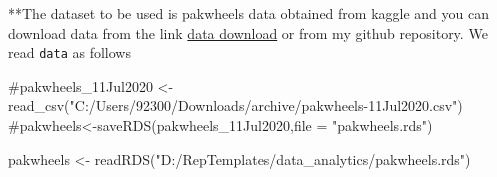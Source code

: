 \documentclass[
  letterpaper,
  DIV=11,
  numbers=noendperiod]{scrartcl}
\newenvironment{Shaded}{\begin{snugshade}}{\end{snugshade}}
\newcommand{\CommentTok}[1]{\textcolor[rgb]{0.37,0.37,0.37}{#1}}
\newcommand{\FunctionTok}[1]{\textcolor[rgb]{0.28,0.35,0.67}{#1}}
\newcommand{\NormalTok}[1]{\textcolor[rgb]{0.00,0.23,0.31}{#1}}
\newcommand{\OtherTok}[1]{\textcolor[rgb]{0.00,0.23,0.31}{#1}}
\newcommand{\StringTok}[1]{\textcolor[rgb]{0.13,0.47,0.30}{#1}}
\begin{document}
**The dataset to be used is pakwheels data obtained from kaggle and you
can download data from the link
\href{https://www.kaggle.com/datasets/spideysloth/pakwheels-cars-dataset}{data
download} or from my github repository. We read \texttt{data} as follows

\begin{Shaded}
\begin{Highlighting}[]
\CommentTok{\#pakwheels\_11Jul2020 \textless{}{-} read\_csv("C:/Users/92300/Downloads/archive/pakwheels{-}11Jul2020.csv")}
\CommentTok{\#pakwheels\textless{}{-}saveRDS(pakwheels\_11Jul2020,file = "pakwheels.rds")}

\NormalTok{pakwheels }\OtherTok{\textless{}{-}} \FunctionTok{readRDS}\NormalTok{(}\StringTok{"D:/RepTemplates/data\_analytics/pakwheels.rds"}\NormalTok{)}


\end{Highlighting}
\end{Shaded}
\end{document}
